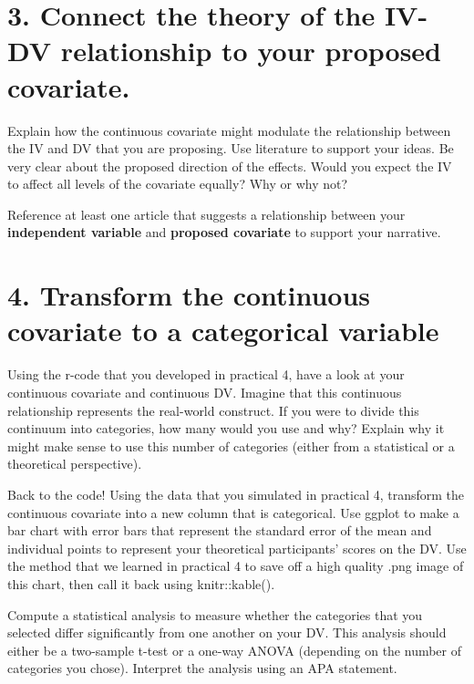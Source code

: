 \documentclass[
]{book}
\begin{document}
\section*{3. Connect the theory of the IV-DV relationship to your proposed covariate.}\label{connect-the-theory-of-the-iv-dv-relationship-to-your-proposed-covariate.}

Explain how the continuous covariate might modulate the relationship between the IV and DV that you are proposing. Use literature to support your ideas. Be very clear about the proposed direction of the effects. Would you expect the IV to affect all levels of the covariate equally? Why or why not?

Reference at least one article that suggests a relationship between your \textbf{independent variable} and \textbf{proposed covariate} to support your narrative.

\section*{4. Transform the continuous covariate to a categorical variable}\label{transform-the-continuous-covariate-to-a-categorical-variable}

Using the r-code that you developed in practical 4, have a look at your continuous covariate and continuous DV. Imagine that this continuous relationship represents the real-world construct. If you were to divide this continuum into categories, how many would you use and why? Explain why it might make sense to use this number of categories (either from a statistical or a theoretical perspective).

Back to the code! Using the data that you simulated in practical 4, transform the continuous covariate into a new column that is categorical. Use ggplot to make a bar chart with error bars that represent the standard error of the mean and individual points to represent your theoretical participants' scores on the DV. Use the method that we learned in practical 4 to save off a high quality .png image of this chart, then call it back using knitr::kable().

Compute a statistical analysis to measure whether the categories that you selected differ significantly from one another on your DV. This analysis should either be a two-sample t-test or a one-way ANOVA (depending on the number of categories you chose). Interpret the analysis using an APA statement.
\end{document}
